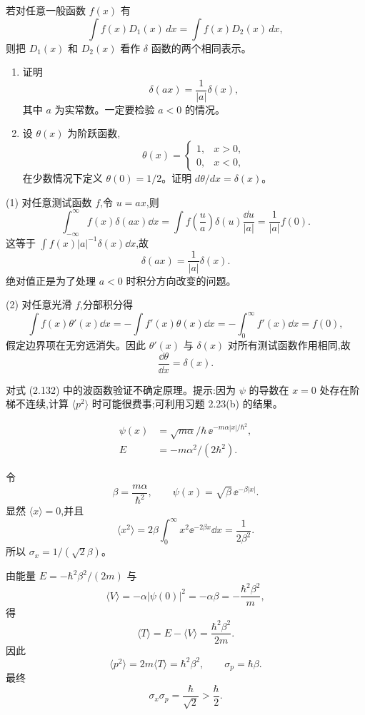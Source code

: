 \begin{question}
若对任意一般函数 $f(x)$ 有
\[
\int f(x)D_1(x)\,dx=\int f(x)D_2(x)\,dx,
\]
则把 $D_1(x)$ 和 $D_2(x)$ 看作 $\delta$ 函数的两个相同表示。
\begin{enumerate}
\item 证明
\[
\delta(ax)=\frac{1}{|a|}\delta(x),
\]
其中 $a$ 为实常数。一定要检验 $a<0$ 的情况。
\item 设 $\theta(x)$ 为阶跃函数,
\[
\theta(x)=\begin{cases}1,&x>0,\\0,&x<0,
\end{cases}
\]
在少数情况下定义 $\theta(0)=1/2$。证明 $d\theta/dx=\delta(x)$。
\end{enumerate}
\begin{solution}
(1) 对任意测试函数 $f$,令 $u=ax$,则
\[
\int_{-\infty}^{\infty}f(x)\delta(ax)\dd x
=\int f\left(\frac{u}{a}\right)\delta(u)\frac{\dd u}{|a|}
=\frac1{|a|}f(0).
\]
这等于 $\int f(x)|a|^{-1}\delta(x)\dd x$,故
\[
\delta(ax)=\frac1{|a|}\delta(x).
\]
绝对值正是为了处理 $a<0$ 时积分方向改变的问题。

(2) 对任意光滑 $f$,分部积分得
\[
\int f(x)\theta'(x)\dd x
=-\int f'(x)\theta(x)\dd x
=-\int_0^\infty f'(x)\dd x=f(0),
\]
假定边界项在无穷远消失。因此 $\theta'(x)$ 与 $\delta(x)$ 对所有测试函数作用相同,故
\[
\frac{\dd\theta}{\dd x}=\delta(x).
\]
\end{solution}
\end{question}

\begin{question}
对式 (2.132) 中的波函数验证不确定原理。提示:因为 $\psi$ 的导数在 $x=0$ 处存在阶梯不连续,计算 $\langle p^2\rangle$ 时可能很费事;可利用习题 2.23(b) 的结果。

\par\smallskip
{}\[\begin{aligned}\psi(x)&=\sqrt{m\alpha}/\hbar\,\ee^{-m\alpha|x|/\hbar^2},\\E&=-m\alpha^2/(2\hbar^2).\end{aligned}\]

\begin{solution}
令
\[
\beta=\frac{m\alpha}{\hbar^2},
\qquad
\psi(x)=\sqrt\beta\,\ee^{-\beta |x|}.
\]
显然 $\langle x\rangle=0$,并且
\[
\langle x^2\rangle=2\beta\int_0^\infty x^2\ee^{-2\beta x}\dd x=\frac1{2\beta^2}.
\]
所以 $\sigma_x=1/(\sqrt2\beta)$。

由能量 $E=-\hbar^2\beta^2/(2m)$ 与
\[
\langle V\rangle=-\alpha |\psi(0)|^2=-\alpha\beta=-\frac{\hbar^2\beta^2}{m},
\]
得
\[
\langle T\rangle=E-\langle V\rangle=\frac{\hbar^2\beta^2}{2m}.
\]
因此
\[
\langle p^2\rangle=2m\langle T\rangle=\hbar^2\beta^2,
\qquad
\sigma_p=\hbar\beta.
\]
最终
\[
\sigma_x\sigma_p=\frac{\hbar}{\sqrt2}>\frac\hbar2.
\]
\end{solution}
\end{question}

